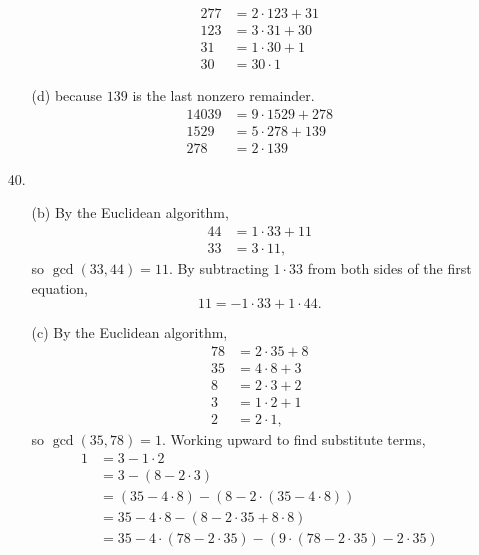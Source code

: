 \documentclass{article}
\begin{document}
\begin{enumerate}
\begin{itemize}
            \begin{align*}
            277 &= 2 \cdot 123 + 31 \\
            123 &= 3 \cdot 31 + 30\\
            31 &= 1 \cdot 30 + 1\\
            30 &= 30 \cdot 1
            \end{align*}
            \item[(d)]  because $139$ is the last nonzero remainder.
            \begin{align*}
            14039 &= 9 \cdot 1529 + 278\\
            1529 &= 5 \cdot 278 + 139\\
            278 &= 2 \cdot 139
            \end{align*}
        \end{itemize}
    \item[40.]
        \begin{itemize}
            \item[(b)] By the Euclidean algorithm,
            \begin{align*}
            44 &= 1 \cdot 33 + 11\\
            33 &= 3 \cdot 11,
            \end{align*}
            so $\gcd(33,44) = 11$. By subtracting $1 \cdot 33$ from both sides of the first equation,
            \[
            11 = -1 \cdot 33 + 1 \cdot 44.
            \]
            \item[(c)] By the Euclidean algorithm,
            \begin{align*}
            78 &= 2 \cdot 35 + 8\\
            35 &= 4 \cdot 8 + 3\\
            8 &= 2 \cdot 3 + 2\\
            3 &= 1 \cdot 2 + 1\\
            2 &= 2 \cdot 1,
            \end{align*}
            so $\gcd(35,78) = 1$. Working upward to find substitute terms,
            \begin{align*}
            1 &= 3 - 1 \cdot 2 \\
            &= 3 - (8 - 2 \cdot 3) \\
            &= (35 - 4 \cdot 8) - (8 - 2 \cdot (35 - 4 \cdot 8)) \\
            &= 35 - 4 \cdot 8 - (8 - 2 \cdot 35 + 8 \cdot 8) \\
            &= 35 - 4 \cdot (78 - 2 \cdot 35) - (9 \cdot (78 - 2 \cdot 35) - 2 \cdot 35) \\

\end{align*}
\end{itemize}
\end{enumerate}
\end{document}
